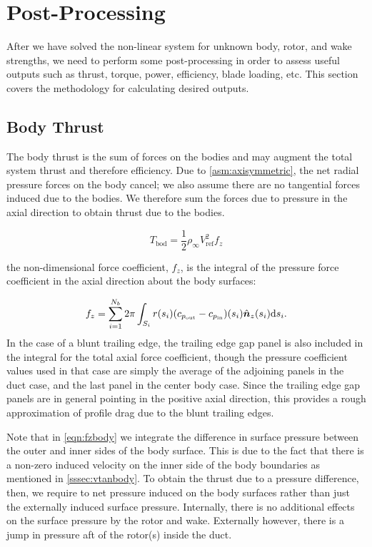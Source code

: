 \section{Post-Processing}
\label{sec:postprocess}

After we have solved the non-linear system for unknown body, rotor, and wake strengths, we need to perform some post-processing in order to assess useful outputs such as thrust, torque, power, efficiency, blade loading, etc.
%
This section covers the methodology for calculating desired outputs.

\subsection{Body Thrust}

The body thrust is the sum of forces on the bodies and may augment the total system thrust and therefore efficiency.
%
Due to \cref{asm:axisymmetric}, the net radial pressure forces on the body cancel; we also assume there are no tangential forces induced due to the bodies.
%
We therefore sum the forces due to pressure in the axial direction to obtain thrust due to the bodies.

\begin{equation}
    T_\text{bod} = \frac{1}{2}\rho_\infty V_\text{ref}^2 f_z
\end{equation}

\where the non-dimensional force coefficient, \(f_z\), is the integral of the pressure force coefficient in the axial direction about the body surfaces:

\begin{equation}
    \label{eqn:fzbody}
    f_z = \sum_{i=1}^{N_b} 2 \pi \int_{S_i} r(s_i) (c_{p_\text{out}}-c_{p_\text{in}}) (s_i) \hat{\bm{n}}_{z}(s_i) \mathrm{d} s_i.
\end{equation}
%
In the case of a blunt trailing edge, the trailing edge gap panel is also included in the integral for the total axial force coefficient, though the pressure coefficient values used in that case are simply the average of the adjoining panels in the duct case, and the last panel in the center body case.
%
Since the trailing edge gap panels are in general pointing in the positive axial direction, this provides a rough approximation of profile drag due to the blunt trailing edges.

Note that in \cref{eqn:fzbody} we integrate the difference in surface pressure between the outer and inner sides of the body surface.
%
This is due to the fact that there is a non-zero induced velocity on the inner side of the body boundaries as mentioned in \cref{sssec:vtanbody}.
%
To obtain the thrust due to a pressure difference, then, we require to net pressure induced on the body surfaces rather than just the externally induced surface pressure.
%
Internally, there is no additional effects on the surface pressure by the rotor and wake.
%
Externally however, there is a jump in pressure aft of the rotor(s) inside the duct.

